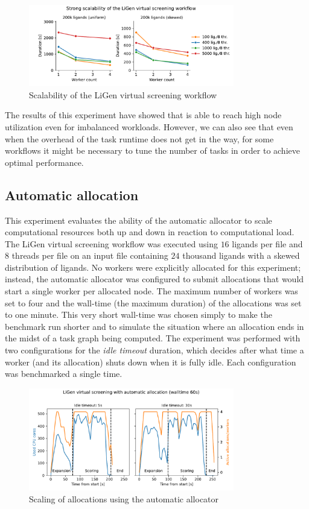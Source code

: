 \begin{figure}[h]
	\centering
	\includegraphics[width=0.8\textwidth]{imgs/hq/charts/ligen-aggregation-scalability}
	\caption{Scalability of the LiGen virtual screening workflow}
	\label{fig:hq-ligen-scalability}
\end{figure}

The results of this experiment have showed that \hyperqueue{} is able to reach high node
utilization even for imbalanced workloads. However, we can also see that even when the overhead of
the task runtime does not get in the way, for some workflows it might be necessary to tune the
number of tasks in order to achieve optimal performance.

\subsection{Automatic allocation}
\label{sec:hq-exp-autoalloc}
This experiment evaluates the ability of the automatic allocator to scale computational resources
both up and down in reaction to computational load. The LiGen virtual screening workflow was
executed using $16$ ligands per file and $8$ threads per
file on an input file containing $24$ thousand ligands with a skewed
distribution of ligands. No workers were explicitly allocated for this experiment; instead, the
automatic allocator was configured to submit allocations that would start a single worker per
allocated node. The maximum number of workers was set to four and the wall-time (the maximum
duration) of the allocations was set to one minute. This very short wall-time was chosen simply to
make the benchmark run shorter and to simulate the situation where an allocation ends in the midst
of a task graph being computed. The experiment was performed with two configurations for the
\emph{idle timeout} duration, which decides after what time a worker (and its allocation) shuts
down when it is fully idle. Each configuration was benchmarked a single time.

\begin{figure}[h]
	\centering
	\includegraphics[width=0.8\textwidth]{imgs/hq/charts/ligen-autoalloc-stats}
	\caption{Scaling of allocations using the automatic allocator}
	\label{fig:hq-ligen-autoalloc}
\end{figure}

